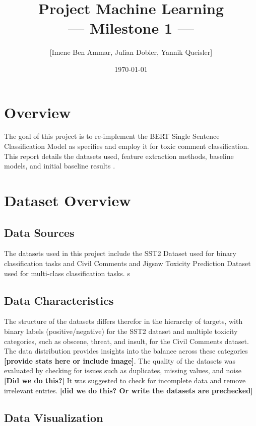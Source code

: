 \documentclass[10pt,a4paper,oneside]{article} %
\title{Project Machine Learning\\--- Milestone 1 ---}
\author{[Imene Ben Ammar, Julian Dobler, Yannik Queisler]}
\date{\today}
\begin{document}
\maketitle

\tableofcontents
\newpage

\section{Overview}
The goal of this project is to re-implement the BERT Single Sentence Classification Model as \cite{kenton2019bert} specifies and employ it for toxic comment classification.
This report details the datasets used, feature extraction methods, baseline models, and initial baseline results .

\section{Dataset Overview}
\subsection{Data Sources}
The datasets used in this project include the SST2 Dataset used for binary classification tasks and Civil Comments and Jigsaw Toxicity Prediction Dataset used for multi-class classification tasks.
s

\subsection{Data Characteristics}
The structure of the datasets differs therefor in the hierarchy of targets, with binary labels (positive/negative) for the SST2 dataset and multiple toxicity categories, such as obscene, threat, and insult, for the Civil Comments dataset. The data distribution provides insights into the balance across these categories \textbf{[provide stats here or include image]}. The quality of the datasets was evaluated by checking for issues such as duplicates, missing values, and noise \textbf{[Did we do this?]} It was suggested to check for incomplete data and remove irrelevant entries. \textbf{[did we do this? Or write the datasets are prechecked]}

\subsection{Data Visualization}
\end{document}
